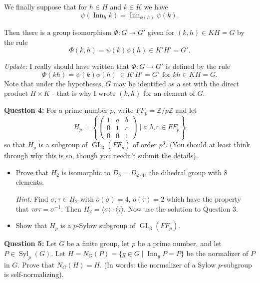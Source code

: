 \documentclass{article}
\newcommand{\Inn}{\operatorname{Inn}}
\begin{document}
We finally suppose that for $h \in H$ and $k \in K$ we have 
$$\psi(\Inn_h k) = \Inn_{\phi(h)} \psi(k).$$

Then there is a group isomorphism $\Phi: G \to G'$ given for $(k,h) \in KH = G$ by the rule 
$$\Phi(k,h) = \psi(k) \phi(h) \in K'H' = G'.$$

\textit{Update:} I really should have written that $\Phi: G \to G'$ is defined by the rule 
\[\Phi(kh) = \psi(k) \phi(h) \
\in K'H' = G' \text{ for } kh \in KH = G.\]
Note that under the hypotheses, $G$ may be identified as a set with the direct product $H \times K$ - that is why I wrote $(k,h)$ for an element of $G$.

\vspace{5mm}

\textbf{Question 4:} For a prime number $p$, write $FF_p = \mathbb{Z}/p\mathbb{Z}$ and let 
$$H_p = \left\{ \begin{pmatrix} 1 & a & b \\ 0 & 1 & c \\ 0 & 0 & 1 \end{pmatrix} \mid a,b,c \in FF_p \right\}$$
so that $H_p$ is a subgroup of $\operatorname{GL}_3(FF_p)$ of order $p^3$. (You should at least think through why this is so, though you needn't submit the details).

\begin{itemize}
    \item Prove that $H_2$ is isomorphic to $D_8 = D_{2 \cdot 4}$, the dihedral group with 8 elements.
    
    \textit{Hint:} Find $\sigma, \tau \in H_2$ with $o(\sigma) = 4$, $o(\tau) = 2$ which have the property that $\tau \sigma \tau = \sigma^{-1}$. Then $H_2 = \langle \sigma \rangle \cdot \langle \tau \rangle$. Now use the solution to Question 3.
    
    \item Show that $H_p$ is a $p$-Sylow subgroup of $\operatorname{GL}_3(FF_p)$.
\end{itemize}

\vspace{5mm}

\textbf{Question 5:} Let $G$ be a finite group, let $p$ be a prime number, and let $P \in \operatorname{Syl}_p(G)$. Let $H = N_G(P) = \{ g \in G \mid \Inn_g P = P \}$ be the normalizer of $P$ in $G$. Prove that $N_G(H) = H$. (In words: the normalizer of a Sylow $p$-subgroup is self-normalizing).

\vspace{5mm}
\end{document}
